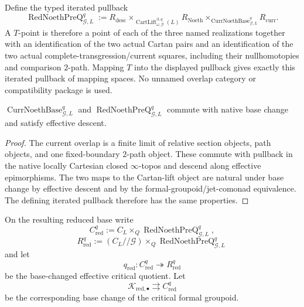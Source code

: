 \begin{definition}
Define the typed iterated pullback
\[
\boxed{
\operatorname{RedNoethPreQ}_{\mathcal G,L}^{q}
:=
R_{\mathrm{desc}}
\times_{\operatorname{CartLift}^{\partial,q}_{\omega,\mathcal G}(L)}
R_{\mathrm{Noeth}}
\times_{\operatorname{CurrNoethBase}_{\mathcal G,L}^q}
R_{\mathrm{curr}}.
}
\]
A $T$-point is therefore a point of each of the three named realizations together
with an identification of the two actual Cartan pairs and an identification of
the two actual complete-transgression/current squares, including their
nullhomotopies and comparison $2$-path.  Mapping $T$ into the displayed
pullback gives exactly this iterated pullback of mapping spaces.  No unnamed
overlap category or compatibility package is used.
\end{definition}

\begin{proposition}
\label{prop:prequantum-reduced-noether-compatibility-locality}
$\operatorname{CurrNoethBase}_{\mathcal G,L}^q$ and
$\operatorname{RedNoethPreQ}_{\mathcal G,L}^q$ commute with native base change
and satisfy effective descent.
\end{proposition}

\begin{proof}
The current overlap is a finite limit of relative section objects, path objects,
and one fixed-boundary $2$-path object.  These commute with pullback in the
native locally Cartesian closed $\infty$-topos and descend along effective
epimorphisms.  The two maps to the Cartan-lift object are natural under base
change by effective descent and by the formal-groupoid/jet-comonad equivalence.
The defining iterated pullback therefore has the same properties.
\end{proof}

On the resulting reduced base write
\[
\boxed{
C_{\mathrm{red}}^q
:=
C_L\times_Q
\operatorname{RedNoethPreQ}_{\mathcal G,L}^{q},
}
\]
\[
R_{\mathrm{red}}^q
:=(C_L//\mathcal G)\times_Q
\operatorname{RedNoethPreQ}_{\mathcal G,L}^{q}
\]
and let
\[
q_{\mathrm{red}}:
C_{\mathrm{red}}^q\twoheadrightarrow R_{\mathrm{red}}^q
\]
be the base-changed effective critical quotient.  Let
\[
\mathcal K_{\mathrm{red},\bullet}
\rightrightarrows C_{\mathrm{red}}^q
\]
be the corresponding base change of the critical formal groupoid.

